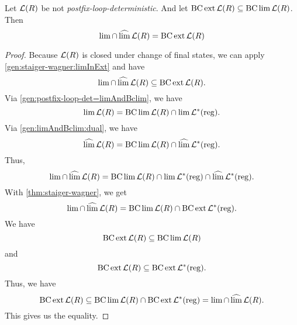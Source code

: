 %
%


\begin{theorem}
\label{gen:R-staiger-wagner}
Let $\Lang(R)$ be not \emph{postfix-loop-deterministic}. And let $\BC \ext \Lang(R) \subseteq \BC \lim \Lang(R)$. Then
\[ \lim \cap \dlim \Lang(R) = \BC \ext \Lang(R) \]
\begin{proof}
Because $\Lang(R)$ is closed under change of final states, we can apply \cref{gen:staiger-wagner:limInExt} and have
\[ \lim \cap \dlim \Lang(R) \subseteq \BC \ext \Lang(R) .\]
Via \cref{gen:postfix-loop-det=limAndBclim}, we have
\[ \lim \Lang(R) = \BC \lim \Lang(R) \cap \lim \Langreg . \]
Via \cref{gen:limAndBclim:dual}, we have
\[ \dlim \Lang(R) = \BC \lim \Lang(R) \cap \dlim \Langreg . \]
Thus,
\[ \lim \cap \dlim \Lang(R) = \BC \lim \Lang(R) \cap \lim \Langreg \cap \dlim \Langreg . \]
With \cref{thm:staiger-wagner}, we get
\[ \lim \cap \dlim \Lang(R) = \BC \lim \Lang(R) \cap \BC \ext \Langreg . \]
We have
\[ \BC \ext \Lang(R) \subseteq \BC \lim \Lang(R) \]
and
\[ \BC \ext \Lang(R) \subseteq \BC \ext \Langreg . \]
Thus, we have
\[ \BC \ext \Lang(R) \subseteq \BC \lim \Lang(R) \cap \BC \ext \Langreg = \lim \cap \dlim \Lang(R). \]
This gives us the equality.
\end{proof}
\end{theorem}

